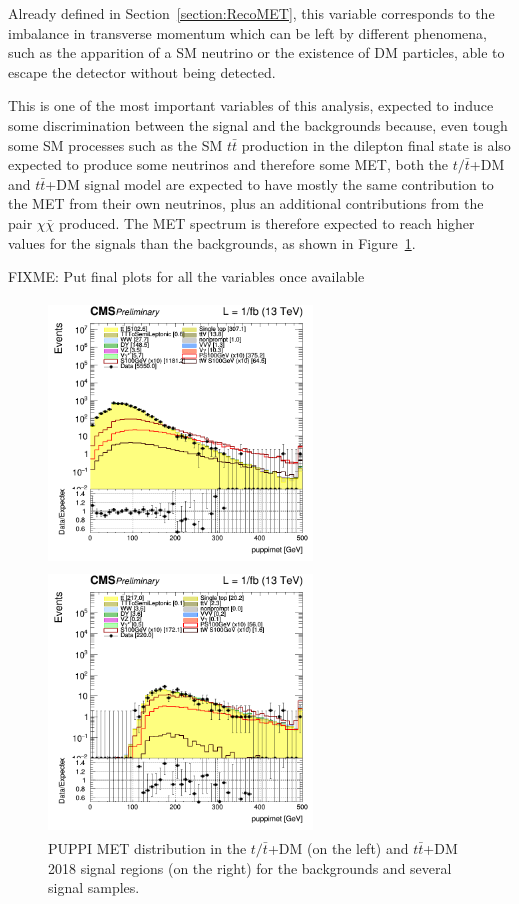 \documentclass[a4paper, 10pt, openright]{report}
\begin{document}
Already defined in Section~\ref{section:RecoMET}, this variable corresponds to the imbalance in transverse momentum which can be left by different phenomena, such as the apparition of a \ac{SM} neutrino or the existence of \ac{DM} particles, able to escape the detector without being detected.

This is one of the most important variables of this analysis, expected to induce some discrimination between the signal and the backgrounds because, even tough some \ac{SM} processes such as the \ac{SM} $t \bar t$ production in the dilepton final state is also expected to produce some neutrinos and therefore some \ac{MET}, both the $t/ \bar t$+DM and $t \bar t$+DM signal model are expected to have mostly the same contribution to the \ac{MET} from their own neutrinos, plus an additional contributions from the pair $\chi \bar \chi$ produced. The \ac{MET} spectrum is therefore expected to reach higher values for the signals than the backgrounds, as shown in Figure~\ref{fig:SRdiscMET}.

\color{red} FIXME: Put final plots for all the variables once available \color{black}

\begin{figure}[htbp]
\centering
\begin{minipage}[b]{.47\textwidth}
\includegraphics[width=7cm, height=7cm]{figs/log_cratio_topCR_ll_2j_signal1_puppimet.png}
\end{minipage}\hfill
\begin{minipage}[b]{.47\textwidth}
\includegraphics[width=7cm, height=7cm]{figs/log_cratio_topCR_ll_2j_signal0_puppimet.png}
\end{minipage}\hfill
\caption{\ac{PUPPI} \ac{MET} distribution in the $t/ \bar t$+DM (on the left) and $t \bar t$+DM 2018 signal regions (on the right) for the backgrounds and several signal samples.}
\label{fig:SRdiscMET}
\end{figure}
\end{document}
